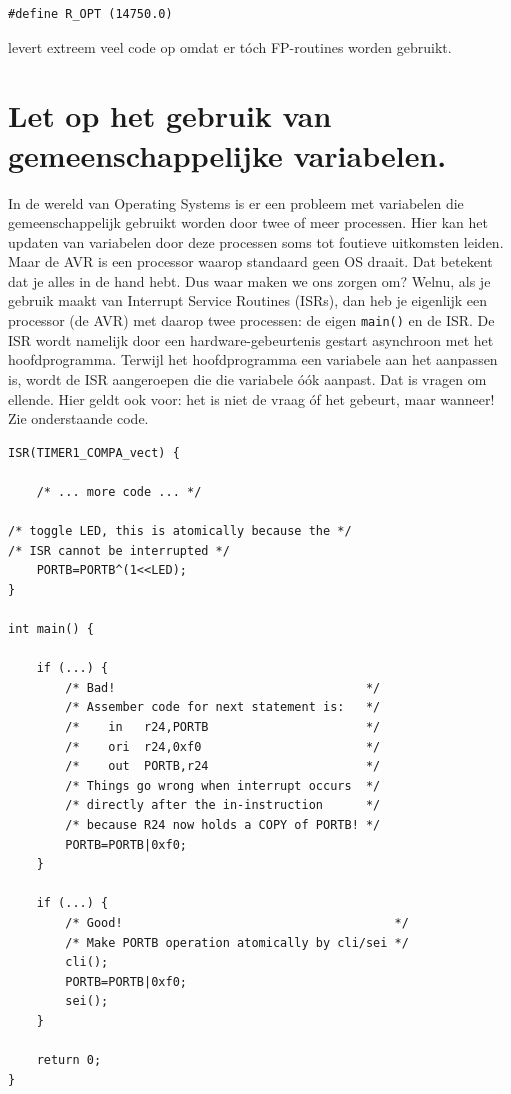 \documentclass[12pt,a4paper,final,oneside,fleqn]{article}
\begin{document}
\begin{lstlisting}[style=nonumbers,belowcaptionskip=-12pt]
#define R_OPT (14750.0)
\end{lstlisting}

\noindent
levert extreem veel code op omdat er t\'{o}ch FP-routines worden gebruikt.


\section{Let op het gebruik van gemeenschappelijke variabelen.}
\label{sec:gemvar}
In de wereld van Operating Systems is er een probleem met variabelen
die gemeenschappelijk gebruikt worden door twee of meer processen.
Hier kan het updaten van variabelen door deze processen soms tot foutieve
uitkomsten leiden. Maar de AVR is een processor waarop standaard geen OS
draait. Dat betekent dat je alles in de hand hebt. Dus waar maken we ons
zorgen om? Welnu, als je gebruik maakt van Interrupt Service Routines (ISRs),
dan heb je eigenlijk een processor (de AVR) met daarop twee processen:
de eigen \texttt{main()} en de ISR. De ISR wordt namelijk door een hardware-gebeurtenis
gestart asynchroon met het hoofdprogramma. Terwijl het hoofdprogramma een
variabele aan het aanpassen is, wordt de ISR aangeroepen die die variabele
\'{o}\'{o}k aanpast. Dat is vragen om ellende. Hier geldt ook voor: het is niet de
vraag \'{o}f het gebeurt, maar wanneer! Zie onderstaande code.

\begin{lstlisting}[style=numbers,caption=Afschermen van gemeenschappelijke variabelen]
ISR(TIMER1_COMPA_vect) {

	/* ... more code ... */
	
/* toggle LED, this is atomically because the */
/* ISR cannot be interrupted */
	PORTB=PORTB^(1<<LED);
}

int main() {

	if (...) {
		/* Bad!                                   */
		/* Assember code for next statement is:   */
		/*    in   r24,PORTB                      */
		/*    ori  r24,0xf0                       */
		/*    out  PORTB,r24                      */
		/* Things go wrong when interrupt occurs  */
		/* directly after the in-instruction      */
		/* because R24 now holds a COPY of PORTB! */
		PORTB=PORTB|0xf0;
	}

	if (...) {
		/* Good!                                      */
		/* Make PORTB operation atomically by cli/sei */
		cli();
		PORTB=PORTB|0xf0;
		sei();
	}		

	return 0;
}
\end{lstlisting}
\end{document}
